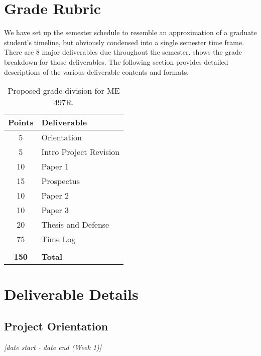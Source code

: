\documentclass[12pt]{article}
\begin{document}
\section{Grade Rubric}
\label{sec:graderubric}

We have set up the semester schedule to resemble an approximation of a graduate student's timeline, but obviously condensed into a single semester time frame.
There are 8 major deliverables due throughout the semester.
 shows the grade breakdown for those deliverables.
The following section provides detailed descriptions of the various deliverable contents and formats.

\begin{table}[h!]
	\caption{Proposed grade division for ME 497R.}
	\label{tab:rubric}
	\renewcommand{\arraystretch}{1.2}
	\vspace{1em}
	\begin{tabular}{c|l}
		\textbf{Points} & \textbf{Deliverable}\\ 
		\hline
		5 & Orientation  \\
		5 & Intro Project Revision \\
		10 & Paper 1 \\
		15 & Prospectus \\
		10 & Paper 2 \\
		10 & Paper 3 \\
		20 & Thesis and Defense \\
		75 & Time Log    \\
		&                \\
		\textbf{150} & \textbf{Total} \\
		
	\end{tabular}
\end{table}





\section{Deliverable Details}
\label{sec:deliverables}


\subsection{Project Orientation}
\label{ssec:orientation}
\textit{[date start - date end (Week 1)]}
\end{document}
